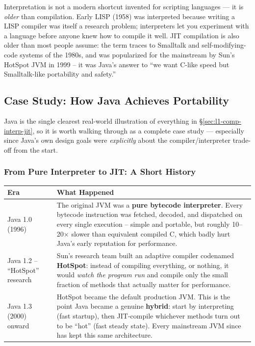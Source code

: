 \documentclass[full-course-notes.tex]{subfiles}
\begin{document}
\begin{historynote}
Interpretation is not a modern shortcut invented for scripting languages --- it is \emph{older}
than compilation. Early LISP (1958) was interpreted because writing a LISP compiler was itself a
research problem; interpreters let you experiment with a language before anyone knew how to
compile it well. JIT compilation is also older than most people assume: the term traces to
Smalltalk and self-modifying-code systems of the 1980s, and was popularized for the mainstream by
Sun's HotSpot JVM in 1999 -- it was Java's answer to ``we want C-like speed but Smalltalk-like
portability and safety.''
\end{historynote}

\subsection{Case Study: How Java Achieves Portability}
\label{sec:l1-java-case-study}

\beyonddb Java is the single clearest real-world illustration of everything in
\S\ref{sec:l1-comp-interp-jit}, so it is worth walking through as a complete case study ---
especially since Java's own design goals were \emph{explicitly} about the compiler/interpreter
trade-off from the start.

\subsubsection{From Pure Interpreter to JIT: A Short History}

\begin{center}
\renewcommand{\arraystretch}{1.35}
\begin{tabularx}{\textwidth}{@{}l X@{}}
\toprule
\textbf{Era} & \textbf{What Happened} \\
\midrule
Java 1.0 (1996) & The original JVM was a \textbf{pure bytecode interpreter}. Every bytecode
instruction was fetched, decoded, and dispatched on every single execution -- simple and
portable, but roughly 10--20$\times$ slower than equivalent compiled C, which badly hurt Java's
early reputation for performance. \\
Java 1.2 -- ``HotSpot'' research & Sun's research team built an adaptive compiler codenamed
\textbf{HotSpot}: instead of compiling everything, or nothing, it would \emph{watch the program
run} and compile only the small fraction of methods that actually matter for performance. \\
Java 1.3 (2000) onward & HotSpot became the default production JVM. This is the point Java
became a genuine \textbf{hybrid}: start by interpreting (fast startup), then JIT-compile
whichever methods turn out to be ``hot'' (fast steady state). Every mainstream JVM since has
kept this same architecture. \\
\bottomrule
\end{tabularx}
\end{center}
\end{document}
